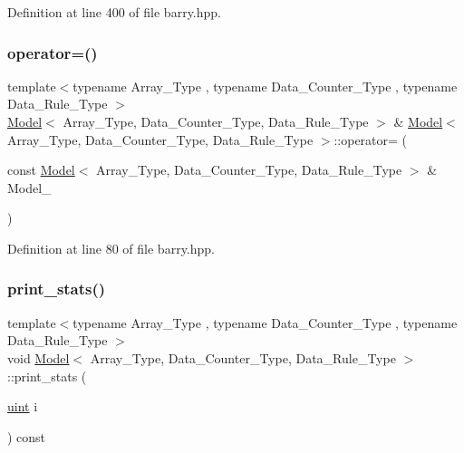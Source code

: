 Definition at line 400 of file barry.\+hpp.

\mbox{\label{classbarry_1_1_model_a4944b5918dc4a9a59f72587da1e6bb3a}} 
\subsubsection{\texorpdfstring{operator=()}{operator=()}}
{\footnotesize\ttfamily template$<$typename Array\+\_\+\+Type , typename Data\+\_\+\+Counter\+\_\+\+Type , typename Data\+\_\+\+Rule\+\_\+\+Type $>$ \\
\hyperlink{classbarry_1_1_model}{Model}$<$ Array\+\_\+\+Type, Data\+\_\+\+Counter\+\_\+\+Type, Data\+\_\+\+Rule\+\_\+\+Type $>$ \& \hyperlink{classbarry_1_1_model}{Model}$<$ Array\+\_\+\+Type, Data\+\_\+\+Counter\+\_\+\+Type, Data\+\_\+\+Rule\+\_\+\+Type $>$\+::operator= (\begin{DoxyParamCaption}\item[{const \hyperlink{classbarry_1_1_model}{Model}$<$ Array\+\_\+\+Type, Data\+\_\+\+Counter\+\_\+\+Type, Data\+\_\+\+Rule\+\_\+\+Type $>$ \&}]{Model\+\_\+ }\end{DoxyParamCaption})\hspace{0.3cm}{\ttfamily [inline]}}



Definition at line 80 of file barry.\+hpp.

\mbox{\label{classbarry_1_1_model_ac00b5c6a1446ad00fdf1d92c9cb1df3c}} 
\subsubsection{\texorpdfstring{print\+\_\+stats()}{print\_stats()}}
{\footnotesize\ttfamily template$<$typename Array\+\_\+\+Type , typename Data\+\_\+\+Counter\+\_\+\+Type , typename Data\+\_\+\+Rule\+\_\+\+Type $>$ \\
void \hyperlink{classbarry_1_1_model}{Model}$<$ Array\+\_\+\+Type, Data\+\_\+\+Counter\+\_\+\+Type, Data\+\_\+\+Rule\+\_\+\+Type $>$\+::print\+\_\+stats (\begin{DoxyParamCaption}\item[{\hyperlink{namespacebarry_a11dfc53ddb4672278319aa04f1e09a6c}{uint}}]{i }\end{DoxyParamCaption}) const\hspace{0.3cm}{\ttfamily [inline]}}



